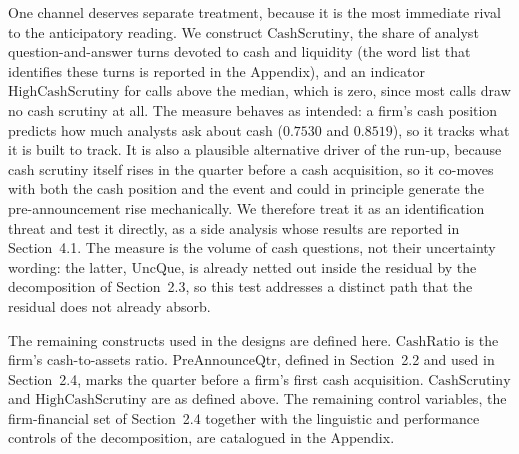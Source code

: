 One channel deserves separate treatment, because it is the most immediate rival to the anticipatory reading. We construct $\mathrm{CashScrutiny}$, the share of analyst question-and-answer turns devoted to cash and liquidity (the word list that identifies these turns is reported in the Appendix), and an indicator $\mathrm{HighCashScrutiny}$ for calls above the median, which is zero, since most calls draw no cash scrutiny at all. The measure behaves as intended: a firm's cash position predicts how much analysts ask about cash ($0.7530$ and $0.8519$), so it tracks what it is built to track. It is also a plausible alternative driver of the run-up, because cash scrutiny itself rises in the quarter before a cash acquisition, so it co-moves with both the cash position and the event and could in principle generate the pre-announcement rise mechanically. We therefore treat it as an identification threat and test it directly, as a side analysis whose results are reported in Section~4.1. The measure is the volume of cash questions, not their uncertainty wording: the latter, $\mathrm{UncQue}$, is already netted out inside the residual by the decomposition of Section~2.3, so this test addresses a distinct path that the residual does not already absorb.

The remaining constructs used in the designs are defined here. $\mathrm{CashRatio}$ is the firm's cash-to-assets ratio. $\mathrm{PreAnnounceQtr}$, defined in Section~2.2 and used in Section~2.4, marks the quarter before a firm's first cash acquisition. $\mathrm{CashScrutiny}$ and $\mathrm{HighCashScrutiny}$ are as defined above. The remaining control variables, the firm-financial set of Section~2.4 together with the linguistic and performance controls of the decomposition, are catalogued in the Appendix.
